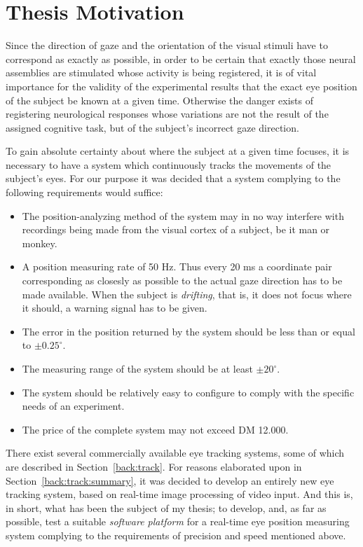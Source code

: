 \section{Thesis Motivation}
\label{intro:motivation}

Since the direction of gaze and the orientation of the visual stimuli
have to correspond as exactly as possible, in order to be certain that
exactly those neural assemblies are stimulated whose activity is being
registered, it is of vital importance for the validity of the
experimental results that the exact eye position of the subject be
known at a given time.  Otherwise the danger exists of registering
neurological responses whose variations are not the result of the
assigned cognitive task, but of the subject's incorrect gaze
direction.

To gain absolute certainty about where the subject at a given time
focuses, it is necessary to have a system which continuously tracks
the movements of the subject's eyes.  For our purpose it was decided
that a system complying to the following requirements would suffice:
\begin{itemize}
\item The position-analyzing method of the system may in no way
  interfere with recordings being made from the visual cortex of a
  subject, be it man or monkey.
\item A position measuring rate of 50 Hz.  Thus every 20 ms a
  coordinate pair corresponding as closesly as possible to the actual
  gaze direction has to be made available.  When the subject is {\em
    drifting\/}, that is, it does not focus where it should, a warning
  signal has to be given.
\item The error in the position returned by the system should be less
  than or equal to $\pm 0.25^{\circ}$.
\item The measuring range of the system should be at least $\pm
  20^{\circ}$.
\item The system should be relatively easy to configure to comply with
  the specific needs of an experiment.
\item The price of the complete system may not exceed DM 12.000.
\end{itemize}

There exist several commercially available eye tracking systems, some
of which are described in Section~\ref{back:track}.  For reasons
elaborated upon in Section~\ref{back:track:summary}, it was decided to
develop an entirely new eye tracking system, based on real-time image
processing of video input.  And this is, in short, what has been the
subject of my thesis; to develop, and, as far as possible, test a
suitable {\em software platform\/} for a real-time eye position
measuring system complying to the requirements of precision and speed
mentioned above.
